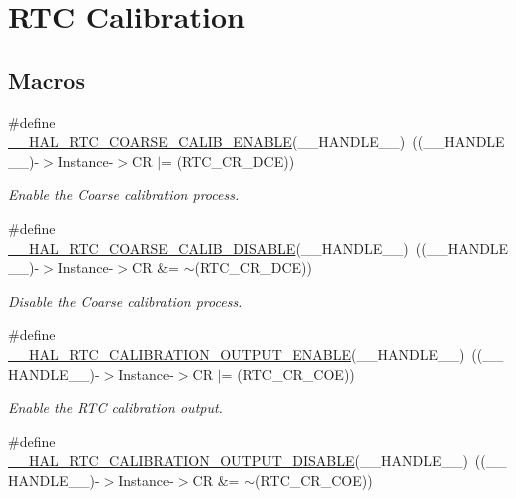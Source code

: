 \hypertarget{group___r_t_c_ex___calibration}{}\section{R\+TC Calibration}
\label{group___r_t_c_ex___calibration}
\subsection*{Macros}
\begin{DoxyCompactItemize}
\item 
\#define \hyperlink{group___r_t_c_ex___calibration_gab252ef767ddb79ab1d5c394074c308d5}{\+\_\+\+\_\+\+H\+A\+L\+\_\+\+R\+T\+C\+\_\+\+C\+O\+A\+R\+S\+E\+\_\+\+C\+A\+L\+I\+B\+\_\+\+E\+N\+A\+B\+LE}(\+\_\+\+\_\+\+H\+A\+N\+D\+L\+E\+\_\+\+\_\+)~((\+\_\+\+\_\+\+H\+A\+N\+D\+L\+E\+\_\+\+\_\+)-\/$>$Instance-\/$>$CR $\vert$= (R\+T\+C\+\_\+\+C\+R\+\_\+\+D\+CE))
\begin{DoxyCompactList}\small\item\em Enable the Coarse calibration process. \end{DoxyCompactList}\item 
\#define \hyperlink{group___r_t_c_ex___calibration_ga98f6fa00897ae97bfec781e7f37290ae}{\+\_\+\+\_\+\+H\+A\+L\+\_\+\+R\+T\+C\+\_\+\+C\+O\+A\+R\+S\+E\+\_\+\+C\+A\+L\+I\+B\+\_\+\+D\+I\+S\+A\+B\+LE}(\+\_\+\+\_\+\+H\+A\+N\+D\+L\+E\+\_\+\+\_\+)~((\+\_\+\+\_\+\+H\+A\+N\+D\+L\+E\+\_\+\+\_\+)-\/$>$Instance-\/$>$CR \&= $\sim$(R\+T\+C\+\_\+\+C\+R\+\_\+\+D\+CE))
\begin{DoxyCompactList}\small\item\em Disable the Coarse calibration process. \end{DoxyCompactList}\item 
\#define \hyperlink{group___r_t_c_ex___calibration_ga28ea614bae2c8b94cd3407535644e7a6}{\+\_\+\+\_\+\+H\+A\+L\+\_\+\+R\+T\+C\+\_\+\+C\+A\+L\+I\+B\+R\+A\+T\+I\+O\+N\+\_\+\+O\+U\+T\+P\+U\+T\+\_\+\+E\+N\+A\+B\+LE}(\+\_\+\+\_\+\+H\+A\+N\+D\+L\+E\+\_\+\+\_\+)~((\+\_\+\+\_\+\+H\+A\+N\+D\+L\+E\+\_\+\+\_\+)-\/$>$Instance-\/$>$CR $\vert$= (R\+T\+C\+\_\+\+C\+R\+\_\+\+C\+OE))
\begin{DoxyCompactList}\small\item\em Enable the R\+TC calibration output. \end{DoxyCompactList}\item 
\#define \hyperlink{group___r_t_c_ex___calibration_gab5c03b27e1117cf17be5df483b1211b8}{\+\_\+\+\_\+\+H\+A\+L\+\_\+\+R\+T\+C\+\_\+\+C\+A\+L\+I\+B\+R\+A\+T\+I\+O\+N\+\_\+\+O\+U\+T\+P\+U\+T\+\_\+\+D\+I\+S\+A\+B\+LE}(\+\_\+\+\_\+\+H\+A\+N\+D\+L\+E\+\_\+\+\_\+)~((\+\_\+\+\_\+\+H\+A\+N\+D\+L\+E\+\_\+\+\_\+)-\/$>$Instance-\/$>$CR \&= $\sim$(R\+T\+C\+\_\+\+C\+R\+\_\+\+C\+OE))

\end{DoxyCompactItemize}

